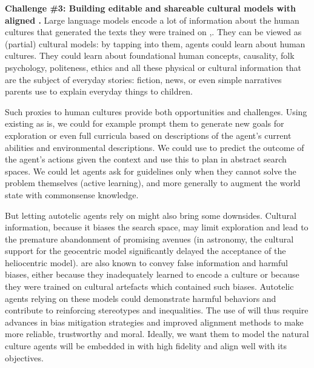 \textbf{Challenge \#3: Building editable and shareable cultural models with aligned \llms.} 
Large language models encode a lot of information about the human cultures that generated the texts they were trained on \llms,\cite{west_symbolic_2021,schramowski2022large}. They can be viewed as (partial) cultural models: by tapping into them, agents could learn about human cultures. They could learn about foundational human concepts, causality, folk psychology, politeness, ethics and all these physical or cultural information that are the subject of everyday stories: fiction, news, or even simple narratives parents use to explain everyday things to children. 

Such proxies to human cultures provide both opportunities and challenges. Using existing \llms as is, we could for example prompt them to generate new goals for exploration or even full curricula based on descriptions of the agent's current abilities and environmental descriptions. We could use \llms to predict the outcome of the agent's actions given the context and use this to plan in abstract search spaces. We could let agents ask \llms for guidelines only when they cannot solve the problem themselves (active learning), and more generally to augment the world state with commonsense knowledge.

But letting autotelic agents rely on \llms might also bring some downsides. Cultural information, because it biases the search space, may limit exploration and lead to the premature abandonment of promising avenues\cite{bonawitz2011Double} (\eg in astronomy, the cultural support for the geocentric model significantly delayed the acceptance of the heliocentric model). \llms are also known to convey false information and harmful biases, either because they inadequately learned to encode a culture or because they were trained on cultural artefacts which contained such biases.\cite{shah-etal-2020-predictive,pmlr-v139-liang21a,weidinger2021ethical,bender2021dangers} Autotelic agents relying on these models could demonstrate harmful behaviors and contribute to reinforcing stereotypes and inequalities. The use of \llms will thus require advances in bias mitigation strategies\cite{pmlr-v139-liang21a,bender2021dangers} and improved alignment methods to make \llms more reliable, trustworthy and moral. Ideally, we want them to model the natural culture agents will be embedded in with high fidelity and align well with its objectives.

